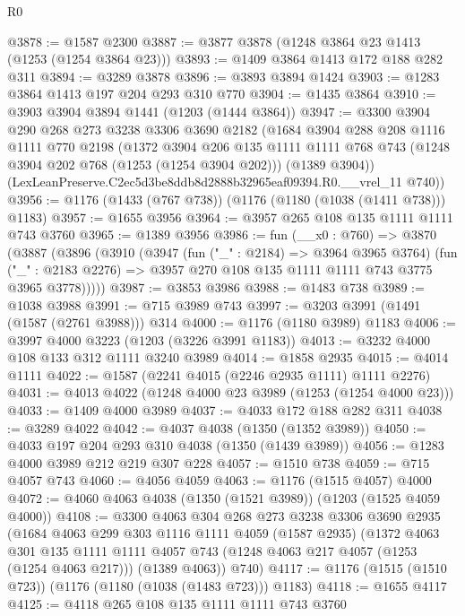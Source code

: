 \begin{lexlean}{R0}
\begin{coremodule}
@3878 := @1587 @2300
@3887 := @3877 @3878 (@1248 @3864 @23 @1413 (@1253 (@1254 @3864 @23)))
@3893 := @1409 @3864 @1413 @172 @188 @282 @311
@3894 := @3289 @3878
@3896 := @3893 @3894 @1424
@3903 := @1283 @3864 @1413 @197 @204 @293 @310 @770
@3904 := @1435 @3864
@3910 := @3903 @3904 @3894 @1441 (@1203 (@1444 @3864))
@3947 := @3300
    @3904
    @290
    @268
    @273
    @3238
    @3306
    @3690
    @2182
    (@1684
      @3904
      @288
      @208
      @1116
      @1111
      @770
      @2198
      (@1372
        @3904
        @206
        @135
        @1111
        @1111
        @768
        @743
        (@1248 @3904 @202 @768 (@1253 (@1254 @3904 @202)))
        (@1389 @3904))
      (LexLeanPreserve.C2ec5d3be8ddb8d2888b32965eaf09394.R0.__vrel_11 @740))
@3956 := @1176 (@1433 (@767 @738)) (@1176 (@1180 (@1038 (@1411 @738))) @1183)
@3957 := @1655 @3956
@3964 := @3957 @265 @108 @135 @1111 @1111 @743 @3760
@3965 := @1389 @3956
@3986 := fun (__x0 : @760) =>
  @3870
    (@3887
      (@3896
        (@3910
          (@3947
            (fun ("_" : @2184) => @3964 @3965 @3764)
            (fun ("_" : @2183 @2276) => @3957 @270 @108 @135 @1111 @1111 @743 @3775 @3965 @3778)))))
@3987 := @3853 @3986
@3988 := @1483 @738
@3989 := @1038 @3988
@3991 := @715 @3989 @743
@3997 := @3203 @3991 (@1491 (@1587 (@2761 @3988))) @314
@4000 := @1176 (@1180 @3989) @1183
@4006 := @3997 @4000 @3223 (@1203 (@3226 @3991 @1183))
@4013 := @3232 @4000 @108 @133 @312 @1111 @3240 @3989
@4014 := @1858 @2935
@4015 := @4014 @1111
@4022 := @1587 (@2241 @4015 (@2246 @2935 @1111) @1111 @2276)
@4031 := @4013 @4022 (@1248 @4000 @23 @3989 (@1253 (@1254 @4000 @23)))
@4033 := @1409 @4000 @3989
@4037 := @4033 @172 @188 @282 @311
@4038 := @3289 @4022
@4042 := @4037 @4038 (@1350 (@1352 @3989))
@4050 := @4033 @197 @204 @293 @310 @4038 (@1350 (@1439 @3989))
@4056 := @1283 @4000 @3989 @212 @219 @307 @228
@4057 := @1510 @738
@4059 := @715 @4057 @743
@4060 := @4056 @4059
@4063 := @1176 (@1515 @4057) @4000
@4072 := @4060 @4063 @4038 (@1350 (@1521 @3989)) (@1203 (@1525 @4059 @4000))
@4108 := @3300
    @4063
    @304
    @268
    @273
    @3238
    @3306
    @3690
    @2935
    (@1684
      @4063
      @299
      @303
      @1116
      @1111
      @4059
      (@1587 @2935)
      (@1372
        @4063
        @301
        @135
        @1111
        @1111
        @4057
        @743
        (@1248 @4063 @217 @4057 (@1253 (@1254 @4063 @217)))
        (@1389 @4063))
      @740)
@4117 := @1176 (@1515 (@1510 @723)) (@1176 (@1180 (@1038 (@1483 @723))) @1183)
@4118 := @1655 @4117
@4125 := @4118 @265 @108 @135 @1111 @1111 @743 @3760

\end{coremodule}
\end{lexlean}
